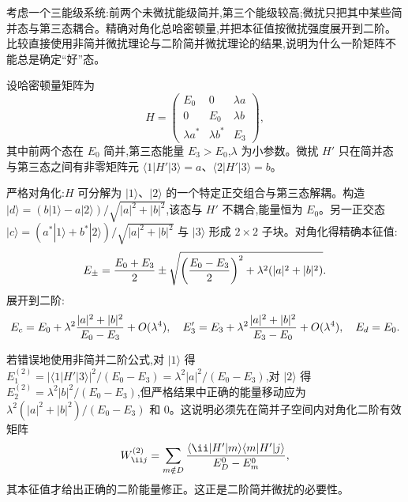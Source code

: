\begin{question}
考虑一个三能级系统:前两个未微扰能级简并,第三个能级较高;微扰只把其中某些简并态与第三态耦合。精确对角化总哈密顿量,并把本征值按微扰强度展开到二阶。比较直接使用非简并微扰理论与二阶简并微扰理论的结果,说明为什么一阶矩阵不能总是确定“好”态。
\begin{solution}
设哈密顿量矩阵为
\[
H = \begin{pmatrix}
E_0 & 0 & \lambda a\\
0 & E_0 & \lambda b\\
\lambda a^* & \lambda b^* & E_3
\end{pmatrix},
\]
其中前两个态在 $E_0$ 简并,第三态能量 $E_3>E_0$,$\lambda$ 为小参数。微扰 $H'$ 只在简并态与第三态之间有非零矩阵元 $\langle 1|H'|3\rangle=a$、$\langle 2|H'|3\rangle=b$。

严格对角化:$H$ 可分解为 $|1\rangle$、$|2\rangle$ 的一个特定正交组合与第三态解耦。构造 $|d\rangle = (b|1\rangle - a|2\rangle)/\sqrt{|a|^2+|b|^2}$,该态与 $H'$ 不耦合,能量恒为 $E_0$。另一正交态 $|c\rangle = (a^*|1\rangle+b^*|2\rangle)/\sqrt{|a|^2+|b|^2}$ 与 $|3\rangle$ 形成 $2\times2$ 子块。对角化得精确本征值:
\[
E_\pm = {E_0+E_3\over2} \pm \sqrt{\left({E_0-E_3\over2}\right)^2 + \lambda^2(|a|^2+|b|^2)}.
\]
展开到二阶:
\[
E_c = E_0 + \lambda^2{|a|^2+|b|^2\over E_0-E_3} + O(\lambda^4),\quad
E_3' = E_3 + \lambda^2{|a|^2+|b|^2\over E_3-E_0} + O(\lambda^4),\quad
E_d = E_0.
\]

若错误地使用非简并二阶公式,对 $|1\rangle$ 得 $E_1^{(2)}=|\langle 1|H'|3\rangle|^2/(E_0-E_3)=\lambda^2|a|^2/(E_0-E_3)$,对 $|2\rangle$ 得 $E_2^{(2)}=\lambda^2|b|^2/(E_0-E_3)$,但严格结果中正确的能量移动应为 $\lambda^2(|a|^2+|b|^2)/(E_0-E_3)$ 和 $0$。这说明必须先在简并子空间内对角化二阶有效矩阵
\[
W^{(2)}_{\ii j}=\sum_{m\notin D}{\langle \ii|H'|m\rangle\langle m|H'|j\rangle\over E_D^0-E_m^0},
\]
其本征值才给出正确的二阶能量修正。这正是二阶简并微扰的必要性。
\end{solution}
\end{question}

